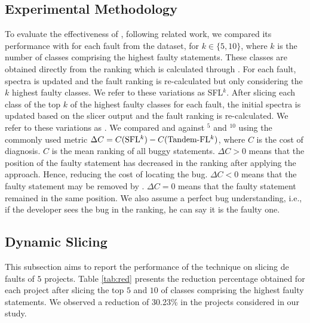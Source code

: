 \documentclass{article}
\begin{document}
\subsection{Experimental Methodology}\label{sec:methodology}

To evaluate the effectiveness of \comb{}, following related work, we compared
its performance with \sfl{} for each fault from the dataset, for $k\in\{5,10\}$,
where $k$ is the number of classes comprising the highest faulty statements.
These classes are obtained directly from the ranking which is calculated through
\sfl{}. For each fault, spectra is updated and the fault ranking is
re-calculated but only considering the $k$ highest faulty classes. We refer to
these variations as SFL$^{k}$. After slicing each class of the top $k$ of the
highest faulty classes for each fault, the initial spectra is updated based on
the slicer output and the fault ranking is re-calculated. We refer to these
variations as . We compared  and  against
\sfl{}$^{5}$ and \sfl{}$^{10}$ using the commonly used metric $\Delta{}C =
C(\textrm{SFL$^{k}$}) - C(\textrm{Tandem-FL$^{k}$})$, where $C$ is the cost of
diagnosis. $C$ is the mean ranking of all buggy statements. $\Delta C >0$ means
that the position of the faulty statement has decreased in the ranking after
applying the  approach. Hence, reducing the cost of locating the bug.
$\Delta C <0$ means that the faulty statement may be removed by .
$\Delta C=0$ means that the faulty statement remained in the same position.  We
also assume a perfect bug understanding, i.e., if the developer sees the bug in
the ranking, he can say it is the faulty one.

\subsection{Dynamic Slicing}\label{sec:ds}

This subsection aims to report the performance of the \ds{} technique on slicing de
faults of $5$ \dfj{} projects. Table \ref{tab:red}
presents the reduction percentage obtained for each project after slicing the top
$5$ and $10$ of classes comprising the highest faulty statements. We observed a reduction
of 30.23\% in the projects considered in our study.
\end{document}
